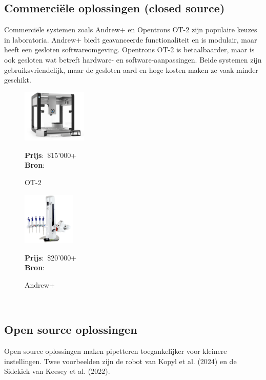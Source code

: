 \subsection{Commerciële oplossingen (closed source)} 
Commerciële systemen zoals Andrew+ en Opentrons OT-2 zijn populaire keuzes in laboratoria. Andrew+ biedt geavanceerde functionaliteit en is modulair, maar heeft een gesloten softwareomgeving. Opentrons OT-2 is betaalbaarder, maar is ook gesloten wat betreft hardware- en software-aanpassingen. Beide systemen zijn gebruiksvriendelijk, maar de gesloten aard en hoge kosten maken ze vaak minder geschikt.
\\[12pt]\begin{minipage}[t]{0.49\textwidth}
    \vspace{0pt}
    \begin{figure}[H]
        \centering
        \captionsetup{width=0.85\textwidth} %
        \includegraphics[height=2.5cm]{figures/opentronsot2.png}
        \caption{OT-2}\label{fig:OT2}
        \textbf{Prijs}:\ \$15'000+\\
        \textbf{Bron}:\ \cite{RN27}
    \end{figure}
\end{minipage}
\begin{minipage}[t]{0.49\textwidth}
    \vspace{0pt}
    \begin{figure}[H]
        \centering
        \captionsetup{width=0.85\textwidth} %
        \includegraphics[height=2.5cm]{figures/Andrew-Alliance-liquid-handling-robot.png}
        \caption{Andrew+}\label{fig:Andrew}
        \textbf{Prijs}:\ \$20'000+\ \cite{RN43}\\
        \textbf{Bron}:\ \cite{RN28}
    \end{figure}
\end{minipage}
\\[12pt]\subsection{Open source oplossingen} 
Open source oplossingen maken pipetteren toegankelijker voor kleinere instellingen. Twee voorbeelden zijn de robot van Kopyl et al. (2024) en de Sidekick van Keesey et al. (2022).

